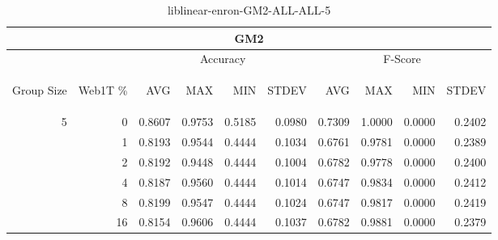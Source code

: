 \begin{center}
\begin{table}[htbp] 
 \begin{center}
\begin{tabular}{ | r | r | r | r | r | r | r | r | r | r |}
\hline
\multicolumn{10}{|c|}{GM2}\\
\hline
 & & \multicolumn{4}{|c|}{Accuracy} & \multicolumn{4}{|c|}{F-Score}\\ \cline{3-10}
\begin{sideways}Group Size\end{sideways} & \begin{sideways}Web1T \%\end{sideways} & \begin{sideways}AVG\end{sideways} & \begin{sideways}MAX\end{sideways} & \begin{sideways}MIN\end{sideways} & \begin{sideways}STDEV\end{sideways} & \begin{sideways}AVG\end{sideways} & \begin{sideways}MAX\end{sideways} & \begin{sideways}MIN\end{sideways} & \begin{sideways}STDEV\end{sideways}\\
\hline
\multirow{5}{*}{5}
 & 0 & 0.8607 & 0.9753 & 0.5185 & 0.0980 & 0.7309 & 1.0000 & 0.0000 & 0.2402\\ \cline{2-10}
 & 1 & 0.8193 & 0.9544 & 0.4444 & 0.1034 & 0.6761 & 0.9781 & 0.0000 & 0.2389\\ \cline{2-10}
 & 2 & 0.8192 & 0.9448 & 0.4444 & 0.1004 & 0.6782 & 0.9778 & 0.0000 & 0.2400\\ \cline{2-10}
 & 4 & 0.8187 & 0.9560 & 0.4444 & 0.1014 & 0.6747 & 0.9834 & 0.0000 & 0.2412\\ \cline{2-10}
 & 8 & 0.8199 & 0.9547 & 0.4444 & 0.1024 & 0.6747 & 0.9817 & 0.0000 & 0.2419\\ \cline{2-10}
 & 16 & 0.8154 & 0.9606 & 0.4444 & 0.1037 & 0.6782 & 0.9881 & 0.0000 & 0.2379\\ \cline{2-10}
\hline
\end{tabular}
\caption{liblinear-enron-GM2-ALL-ALL-5}
\label{table:liblinear-enron-GM2-ALL-ALL-5}
\end{center}
 \end{table}
\end{center}

